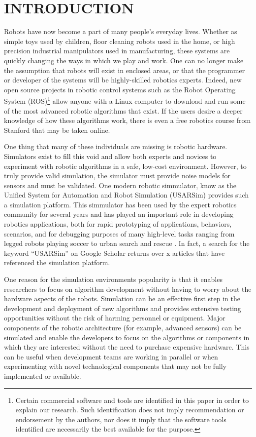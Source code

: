 \section*{INTRODUCTION}
Robots have now become a part of many people's everyday lives. Whether as simple toys used by children, floor cleaning robots used in the home, or high precision industrial manipulators used in manufacturing, these systems are quickly changing the ways in which we play and work. One can no longer make the assumption that robots will exist in enclosed areas, or that the programmer or developer of the systems will be highly-skilled robotics experts. Indeed, new open source projects in robotic control systems such as the Robot Operating System (ROS)\footnote{Certain commercial software and tools are identified in this paper in order to explain our research. Such identification does not imply recommendation or endorsement by the authors, nor does it imply that the software tools identified are necessarily the best available for the purpose.}\cite{ROSWeb} allow anyone with a Linux computer to download and run some of the most advanced robotic algorithms that exist. If the users desire a deeper knowledge of how these algorithms work, there is even a free robotics course from Stanford that may be taken online.

One thing that many of these individuals are missing is robotic hardware. Simulators exist to fill this void and allow both experts and novices to experiment with robotic algorithms in a safe, low-cost environment. However, to truly provide valid simulation, the simulator must provide noise models for sensors and must be validated. One modern robotic simmulator, know as the Unified System for Automation and Robot Simulation (USARSim) \cite{USARSimWeb}  provides such a simulation platform. This simmulator has been used by the expert robotics community for several years and has played an important role in developing robotics applications, both for rapid prototyping of applications, behaviors, scenarios, and for debugging purposes of many high-level tasks ranging from legged robots playing soccer \cite{ZARATTI.LNAI.2007} to urban search and rescue \cite{CARPIN.LNAI.2006,WANG.WSC.2003}. In fact, a search for the keyword ``USARSim'' on Google Scholar returns over x articles that have referenced the simulation platform.

One reason for the simulation environments popularity is that it enables researchers to focus on algorithm development without having to worry about the hardware aspects of the robots. Simulation can be an effective first step in the development and deployment of new algorithms and provides extensive testing opportunities without the risk of harming personnel or equipment. Major components of the robotic architecture (for example, advanced sensors) can be simulated and enable the developers to focus on the algorithms or components in which they are interested without the need to purchase expensive hardware. This can be useful when development teams are working in parallel or when experimenting with novel technological components that may not be fully implemented or available.

